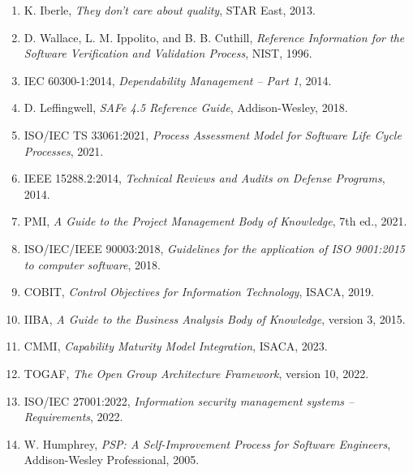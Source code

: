 \documentclass[a4paper,11pt]{ltjsarticle}
\numberwithin{figure}{section}
\numberwithin{table}{section}
\begin{document}
\begin{enumerate}
  \item K. Iberle, \textit{They don't care about quality}, STAR East, 2013.
  \item D. Wallace, L. M. Ippolito, and B. B. Cuthill, \textit{Reference Information for the Software Verification and Validation Process}, NIST, 1996.
  \item IEC 60300-1:2014, \textit{Dependability Management -- Part 1}, 2014.
  \item D. Leffingwell, \textit{SAFe 4.5 Reference Guide}, Addison-Wesley, 2018.
  \item ISO/IEC TS 33061:2021, \textit{Process Assessment Model for Software Life Cycle Processes}, 2021.
  \item IEEE 15288.2:2014, \textit{Technical Reviews and Audits on Defense Programs}, 2014.
  \item PMI, \textit{A Guide to the Project Management Body of Knowledge}, 7th ed., 2021.
  \item ISO/IEC/IEEE 90003:2018, \textit{Guidelines for the application of ISO 9001:2015 to computer software}, 2018.
  \item COBIT, \textit{Control Objectives for Information Technology}, ISACA, 2019.
  \item IIBA, \textit{A Guide to the Business Analysis Body of Knowledge}, version 3, 2015.
  \item CMMI, \textit{Capability Maturity Model Integration}, ISACA, 2023.
  \item TOGAF, \textit{The Open Group Architecture Framework}, version 10, 2022.
  \item ISO/IEC 27001:2022, \textit{Information security management systems -- Requirements}, 2022.
  \item W. Humphrey, \textit{PSP: A Self-Improvement Process for Software Engineers}, Addison-Wesley Professional, 2005.
\end{enumerate}
\end{document}

